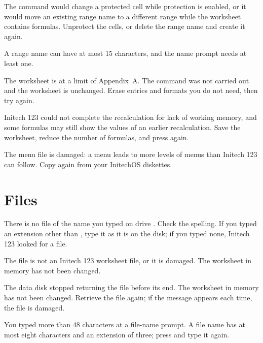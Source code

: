 \Solution The command would change a protected cell while protection is
enabled, or it would move an existing range name to a different range while
the worksheet contains formulas.  Unprotect the cells, or delete the range
name and create it again.

\Solution A range name can have at most 15 characters, and the name prompt
needs at least one.

\Solution The worksheet is at a limit of Appendix~A.  The command was not
carried out and the worksheet is unchanged.  Erase entries and formats you do
not need, then try again.

\Solution Initech 123 could not complete the recalculation for lack of
working memory, and some formulas may still show the values of an earlier
recalculation.  Save the worksheet, reduce the number of formulas, and press
 again.

\Solution The menu file  is damaged: a menu leads to more
levels of menus than Initech 123 can follow.  Copy  again
from your InitechOS diskettes.

\section{Files}
\Solution There is no file of the name you typed on drive .  Check
the spelling.  If you typed an extension other than , type it as
it is on the disk; if you typed none, Initech 123 looked for a 
file.

\Solution The file is not an Initech 123 worksheet file, or it is damaged.
The worksheet in memory has not been changed.

\Solution The data disk stopped returning the file before its end.  The
worksheet in memory has not been changed.  Retrieve the file again; if the
message appears each time, the file is damaged.

\Solution You typed more than 48 characters at a file-name prompt.  A file
name has at most eight characters and an extension of three; press
 and type it again.

